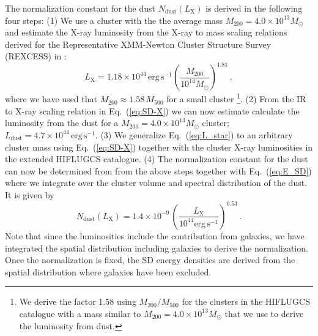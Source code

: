 \documentclass[10pt,aps,pra,reprint,amsmath,amsfonts,amssymb,showpacs]{revtex4-1}
\newcommand{\rmn}{\mathrm}
\newcommand{\msun}{M_\odot}
\newcommand{\dust}{\rmn{dust}}
\newcommand{\lx}{L_\rmn{X}}
\newcommand{\mvir}{M_{200}}
\begin{document}
The normalization constant for the dust $N_\dust(\lx)$ is derived in the
following four steps: (1) We use a cluster with the the average mass
$\mvir=4.0\times10^{13}\msun$ and estimate the X-ray luminosity from
the X-ray to mass scaling relations derived for the Representative
XMM-Newton Cluster Structure Survey (REXCESS) in
\cite{2009A&A...498..361P}:
\begin{equation}
\lx=1.18\times 10^{44}\,\rmn{erg\,s}^{-1}
\left(\frac{M_{200}}{10^{14}\msun}\right)^{1.81}\,,
\end{equation}
where we have used that $M_\rmn{200} \approx 1.58\,M_\rmn{500}$ for a
small cluster \footnote{We derive the factor 1.58 using
  $M_\rmn{200}/M_\rmn{500}$ for the clusters in the HIFLUGCS catalogue
  with a mass similar to $\mvir=4.0\times10^{13}\msun$ that we use to
  derive the luminosity from dust.}. (2) From the IR to X-ray scaling
relation in Eq.~(\ref{eq:SD-X}) we can now estimate calculate the
luminosity from the dust for a $\mvir=4.0\times10^{13}\msun$ cluster;
$L_\dust=4.7\times10^{44}\,\rmn{erg\,s}^{-1}$. (3) We generalize
Eq.~(\ref{eq:L_star}) to an arbitrary cluster mass using
Eq.~(\ref{eq:SD-X}) together with the cluster X-ray luminosities in
the extended HIFLUGCS catalogue. (4) The normalization constant for
the dust can now be determined from from the above steps together with
Eq.~(\ref{eq:E_SD}) where we integrate over the cluster volume and
spectral distribution of the dust. It is given by
\begin{equation}
 N_\dust(\lx) = 1.4\times10^{-9}\,
\left(\frac{\lx}{10^{44}\rmn{erg\,s}^{-1}}\right)^{0.53}\,.
\label{eq:N_dust}
\end{equation}
Note that since the luminosities include the contribution from
galaxies, we have integrated the spatial distribution including
galaxies to derive the normalization. Once the normalization is fixed,
the SD energy densities are derived from the spatial distribution
where galaxies have been excluded.
\end{document}
